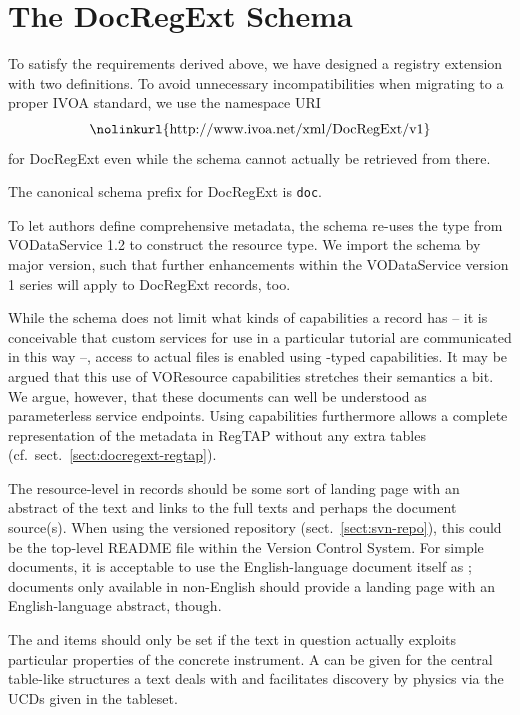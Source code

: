 \documentclass{ivoa}
\begin{document}
\section{The DocRegExt Schema}

\label{sect:regext}

To satisfy the requirements derived above, we have designed a registry extension with
two definitions.
To avoid unnecessary incompatibilities when migrating to a proper IVOA
standard, we use the namespace URI
$$\hbox{\nolinkurl{http://www.ivoa.net/xml/DocRegExt/v1}}$$
for DocRegExt even while the schema cannot actually be retrieved from
there.

The canonical schema prefix for DocRegExt is \texttt{doc}.

To let authors define comprehensive metadata, the schema
re-uses the  type
from VODataService 1.2 \citep{2021ivoa.spec.1102D} to construct
the  resource type.  We import the schema by major
version, such that further enhancements within the VODataService version
1 series will apply to DocRegExt records, too.

While the schema does not limit what kinds of capabilities a
 record has -- it is conceivable that custom
services for use in a particular tutorial
are communicated in this way --, access to actual files is
enabled using -typed capabilities.  It may be
argued that this use of VOResource capabilities stretches their
semantics a bit.  We argue, however, that these documents can well be
understood as parameterless service endpoints.  Using capabilities
furthermore allows a complete representation of the metadata in RegTAP
without any extra tables (cf.~sect.~\ref{sect:docregext-regtap}).

The resource-level  in  records should
be some sort of landing page with an abstract of the text and links to
the full texts and perhaps the document source(s).  When using the
versioned repository (sect.~\ref{sect:svn-repo}), this could be the
top-level README file within the Version Control System.  For simple documents, it is
acceptable to use the English-language document itself as
; documents only available in non-English should
provide a landing page with an English-language abstract, though.

The  and  items should only be set
if the text in question actually exploits particular properties of the
concrete instrument.  A  can be given for the central
table-like structures a text deals with and facilitates discovery by
physics via the UCDs given in the tableset.
\end{document}
